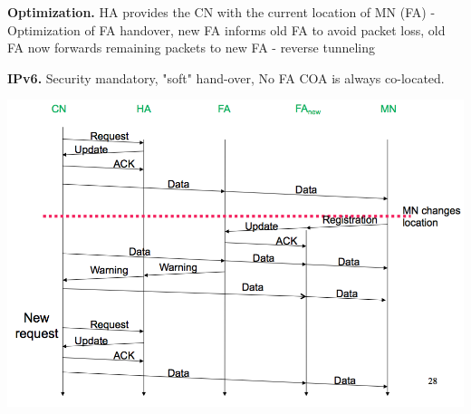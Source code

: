 \documentclass[10pt,twocolumn]{article}
\renewcommand{\bf}{\textbf}
\begin{document}
\bf{Optimization.}  HA provides the CN with the current location of MN (FA) - Optimization of FA handover,  new FA informs old FA to avoid packet loss, old FA now forwards remaining packets to new FA - reverse tunneling

\bf{IPv6.} Security mandatory, "soft" hand-over, No FA COA is always co-located.

\includegraphics[width=\linewidth]{figures/mobile-ip-handover.png}
\end{document}
